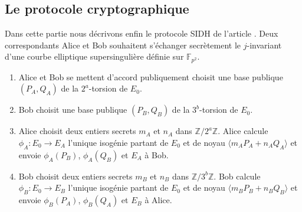 \documentclass{article}
\theoremstyle{plain}%
\theoremstyle{definition}%
\newcommand{\F}{\mathbb{F}}
\newcommand{\Z}{\mathbb{Z}}
\begin{document}
\subsection{Le protocole cryptographique}

Dans cette partie nous décrivons enfin le protocole SIDH de l'article \cite{DeFeo}. Deux correspondants Alice et Bob souhaitent s'échanger secrètement le $j$-invariant d'une courbe elliptique supersingulière définie sur $\F_{p^2}$.



\begin{enumerate}
  \item Alice et Bob se mettent d'accord publiquement choisit une base publique $(P_A, Q_A)$ de la $2^a$-torsion de $E_0$.
  \item Bob   choisit une base publique $(P_B, Q_B)$ de la $3^b$-torsion de $E_0$.
  \item 
    Alice choisit deux entiers secrets $m_A$ et $n_A$ dans $\Z/2^a\Z$.
    Alice calcule $\phi_A : E_0 \to E_A$ l'unique isogénie partant de $E_0$ et de noyau $\langle m_AP_A +n_AQ_A \rangle$ et envoie $\phi_A(P_B)$, $\phi_A(Q_B)$ et $E_A$ à Bob.
  \item  
    Bob   choisit deux entiers secrets $m_B$ et $n_B$ dans $\Z/3^b\Z$.
    Bob   calcule $\phi_B : E_0 \to E_B$ l'unique isogénie partant de $E_0$ et de noyau $\langle m_BP_B +n_BQ_B \rangle$ et envoie $\phi_B(P_A)$, $\phi_B(Q_A)$ et $E_B$ à Alice.


\end{enumerate}



\end{document}
